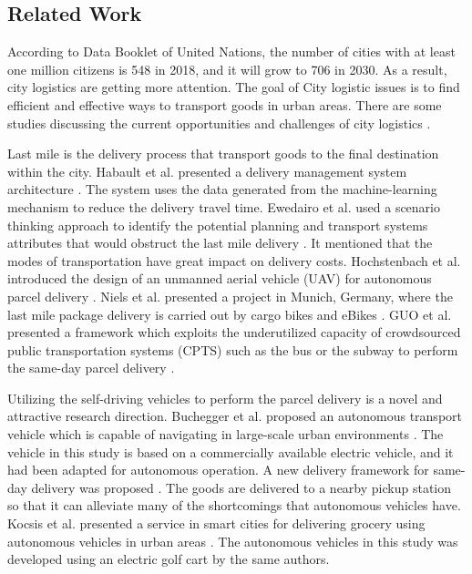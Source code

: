 \documentclass[12pt]{ksthesis}
\begin{document}
\begin{thesis}
{  


\chapter{Related Work} \label{Chap:Related}


According to Data Booklet of United Nations\cite{UnitedNations2018}, the number of cities with at least one million citizens is 548 in 2018, and it will grow to 706 in 2030. As a result, city logistics are getting more attention. The goal of City logistic issues is to find efficient and effective ways to transport goods in urban areas. There are some studies discussing the current opportunities and challenges of city logistics \cite{Savelsbergh2016}\cite{Crainic2015}.
 
Last mile is the delivery process that transport goods to the final destination within the city. Habault et al. presented a delivery management system architecture \cite{Habault2019}. The system uses the data generated from the machine-learning mechanism to reduce the delivery travel time. Ewedairo et al. used a scenario thinking approach to identify the potential planning and transport systems attributes that would obstruct the last mile delivery \cite{Ewedairo2019}. It mentioned that the modes of transportation have great impact on delivery costs. Hochstenbach et al. introduced the design of an unmanned aerial vehicle (UAV) for autonomous parcel delivery \cite{Hochstenbach2016}. Niels et al. presented a project in Munich, Germany, where the last mile package delivery is carried out by cargo bikes and eBikes \cite{Niels2018}. GUO et al. presented a framework which exploits the underutilized capacity of crowdsourced public transportation systems (CPTS) such as the bus or the subway to perform the same-day parcel delivery \cite{Cheng2019}.

Utilizing the self-driving vehicles to perform the parcel delivery is a novel and attractive research direction. Buchegger et al. proposed an autonomous transport vehicle which is capable of navigating in large-scale urban environments \cite{Buchegger2018}. The vehicle in this study is based on a commercially available electric vehicle, and it had been adapted for autonomous operation. A new delivery framework for same-day delivery was proposed \cite{Ulmer2019}. The goods are delivered to a nearby pickup station so that it can alleviate many of the shortcomings that autonomous vehicles have. Kocsis et al. presented a service in smart cities for delivering grocery using autonomous vehicles in urban areas \cite{Kocsis2018}. The autonomous vehicles in this study was developed using an electric golf cart by the same authors.


}
\end{thesis}
\end{document}
